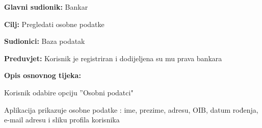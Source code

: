 		
			\noindent {}
			\begin{packed_item}
				
				\item \textbf{Glavni sudionik: }Bankar
				\item  \textbf{Cilj:} Pregledati osobne podatke
				\item  \textbf{Sudionici:} Baza podatak
				\item  \textbf{Preduvjet:} Korisnik je registriran i dodijeljena su mu prava bankara 
				\item  \textbf{Opis osnovnog tijeka:}
				
				\item[] \begin{packed_enum}
					
					\item  Korisnik odabire opciju ”Osobni podatci"
					\item  Aplikacija prikazuje osobne podatke : ime, prezime, adresu, OIB, datum rođenja, e-mail adresu i sliku profila korisnika
				\end{packed_enum}
				
			\end{packed_item}
            		
          
          
